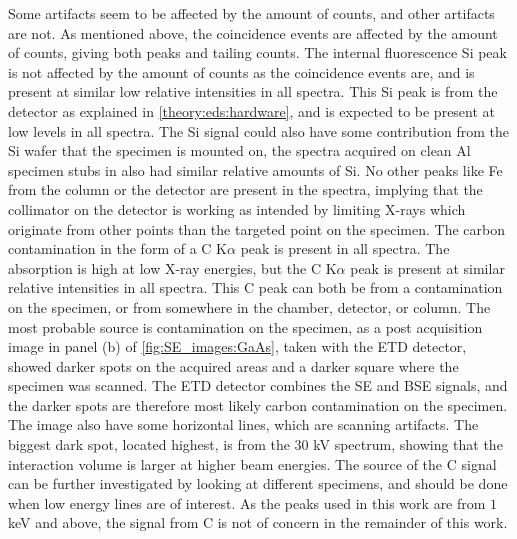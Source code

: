 Some artifacts seem to be affected by the amount of counts, and other artifacts are not.
As mentioned above, the coincidence events are affected by the amount of counts, giving both peaks and tailing counts.
The internal fluorescence Si peak is not affected by the amount of counts as the coincidence events are, and is present at similar low relative intensities in all spectra.
This Si peak is from the detector as explained in \cref{theory:eds:hardware}, and is expected to be present at low levels in all spectra.
The Si signal could also have some contribution from the Si wafer that the specimen is mounted on, the spectra acquired on clean Al specimen stubs in \cite{project_report} also had similar relative amounts of Si.
No other peaks like Fe from the column or the detector are present in the spectra, implying that the collimator on the detector is working as intended by limiting X-rays which originate from other points than the targeted point on the specimen.
The carbon contamination in the form of a C K$\alpha$ peak is present in all spectra.
The absorption is high at low X-ray energies, but the C K$\alpha$ peak is present at similar relative intensities in all spectra.
This C peak can both be from a contamination on the specimen, or from somewhere in the chamber, detector, or column.
The most probable source is contamination on the specimen, as a post acquisition image in panel (b) of \cref{fig:SE_images:GaAs}, taken with the ETD detector, showed darker spots on the acquired areas and a darker square where the specimen was scanned.
The ETD detector combines the SE and BSE signals, and the darker spots are therefore most likely carbon contamination on the specimen.
The image also have some horizontal lines, which are scanning artifacts.
The biggest dark spot, located highest, is from the $30$ kV spectrum, showing that the interaction volume is larger at higher beam energies.
The source of the C signal can be further investigated by looking at different specimens, and should be done when low energy lines are of interest.
As the peaks used in this work are from $1$ keV and above, the signal from C is not of concern in the remainder of this work.


